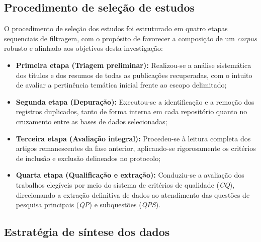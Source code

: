 \documentclass[
	12pt,				%
	oneside,			%
	a4paper,			%
	english,			%
	brazil				%
	]{abntex2ppgsi}
\begin{document}
   







    \subsection{Procedimento de seleção de estudos}
    \label{procedimentoSelecao}

    O procedimento de seleção dos estudos foi estruturado em quatro etapas sequenciais de filtragem, com o propósito de favorecer a composição de um \textit{corpus} robusto e alinhado aos objetivos desta investigação:

\begin{itemize}
    \item[] \textbf{Primeira etapa (Triagem preliminar):} Realizou-se a análise sistemática dos títulos e dos resumos de todas as publicações recuperadas, com o intuito de avaliar a pertinência temática inicial frente ao escopo delimitado;
    \item[] \textbf{Segunda etapa (Depuração):} Executou-se a identificação e a remoção dos registros duplicados, tanto de forma interna em cada repositório quanto no cruzamento entre as bases de dados selecionadas;
    \item[] \textbf{Terceira etapa (Avaliação integral):} Procedeu-se à leitura completa dos artigos remanescentes da fase anterior, aplicando-se rigorosamente os critérios de inclusão e exclusão delineados no protocolo;
    \item[] \textbf{Quarta etapa (Qualificação e extração):} Conduziu-se a avaliação dos trabalhos elegíveis por meio do sistema de critérios de qualidade (\textit{CQ}), direcionando a extração definitiva de dados ao atendimento das questões de pesquisa principais (\textit{QP}) e subquestões (\textit{QPS}).
\end{itemize}

    \subsection{Estratégia de síntese dos dados}
\end{document}
